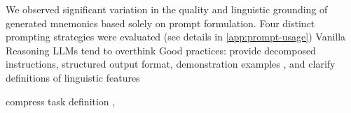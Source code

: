 We observed significant variation in the quality and linguistic grounding of generated mnemonics based solely on prompt formulation. Four distinct prompting strategies were evaluated (see details in \cref{app:prompt-usage})
Vanilla
Reasoning LLMs tend to overthink \citep{xuChainDraftThinking2025}
Good practices: provide decomposed instructions, structured output format, demonstration examples \citep{MishraREFRAMING2022}, and clarify definitions of linguistic features \citep{yinDidYouRead2023}

compress task definition \citep{yinDidYouRead2023},
